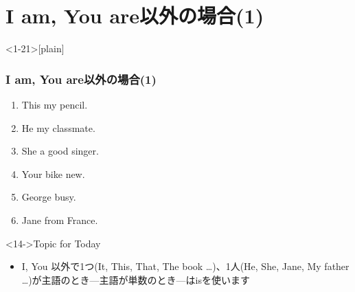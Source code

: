 \documentclass[aspectratio=169,xcolor={dvipsnames,table}]{beamer}
\begin{document}
\section{I am, You are以外の場合(1)}
\begin{frame}<1-21>[plain]\frametitle{I am, You are以外の場合(1)}
  \begin{enumerate}
   \item<1-> This \textbf{\color{Maroon}{is}} my pencil. \hfill{}
   \item<1-> He \textbf{\color{Maroon}{is}} my classmate. \hfill{}
   \item<1-> She \textbf{\color{Maroon}{is}} a good singer. \hfill{}
   \item<1-> Your bike \textbf{\color{Maroon}{is}} new. \hfill{}
   \item<1-> George \textbf{\color{Maroon}{is}} busy. \hfill{}
   \item<1-> Jane \textbf{\color{Maroon}{is}} from France. \hfill{}
  \end{enumerate}

\bigskip

\begin{exampleblock}<14->{Topic for Today}
\begin{itemize}
 \item I, You 以外で1つ(It, This, That, The book \ldots{})、1人(He, She, Jane, My father \ldots{})が主語のとき---主語が単数のとき---はisを使います
\end{itemize}  
     \end{exampleblock}

\end{frame}
\end{document}
